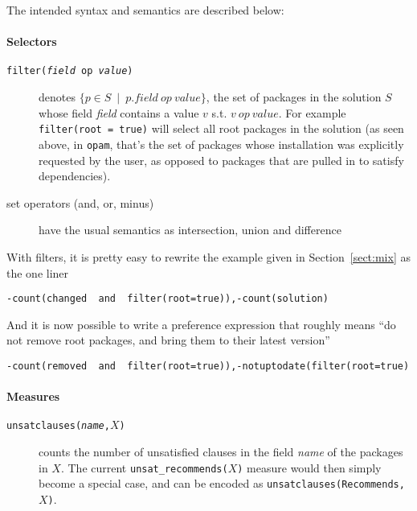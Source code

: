 \documentclass{article}
\begin{document}
The intended syntax and semantics are described below:

\paragraph{Selectors}
\begin{description}
  \item[\texttt{filter(\emph{field} op \emph{value})}] denotes $\{ p \in S ~\mid~  p.field ~op~ value \}$, the set of packages in the solution $S$ whose field \emph{field} contains a value $v$ s.t.
        $v~op~value$. For example  \texttt{filter(root = true)} will select all root packages in the solution (as seen above, in \texttt{opam}, that's the set of packages whose installation was explicitly
        requested by the user, as opposed to packages that are pulled in to satisfy dependencies).
  \item[set operators (and, or, minus)] have the usual semantics as intersection, union and difference
\end{description}


\noindent With filters, it is pretty easy to rewrite the example given in Section~\ref{sect:mix} as the one liner

\begin{center}
\texttt{-count(changed ~and~ filter(root=true)),-count(solution)}
\end{center}

And it is now possible to write a preference expression that roughly means
``do not remove root packages, and bring them to their latest version''

\begin{center}
\texttt{-count(removed ~and~ filter(root=true)),-notuptodate(filter(root=true)}
\end{center}

\paragraph{Measures}

\begin{description}
  \item[\texttt{unsatclauses(\emph{name},$X$)}] counts the number of unsatisfied clauses in the field \emph{name} of the packages in $X$. 
The current \texttt{unsat\_recommends($X$)} measure would then simply become a special case, and can be encoded as \texttt{unsatclauses(Recommends,$X$)}.
\end{description}
\end{document}
